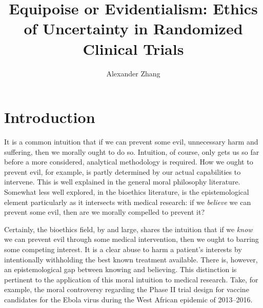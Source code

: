 \documentclass[letterpaper,notitlepage,12pt]{article}
\title{Equipoise or Evidentialism: Ethics of Uncertainty in Randomized Clinical
Trials}
\author{Alexander Zhang}
\date{}
\begin{document}
\maketitle

\section{Introduction}

It is a common intuition that if we can prevent some evil, unnecessary harm and
suffering, then we morally ought to do so.
Intuition, of course, only gets us so far before a more considered, analytical
methodology is required.
How we ought to prevent evil, for example, is partly determined by our actual
capabilities to intervene.
This is well explained in the general moral philosophy literature.
Somewhat less well explored, in the bioethics literature, is the epistemological
element particularly as it intersects with medical research: if we
\textit{believe} we can prevent some evil, then are we morally compelled to
prevent it?

Certainly, the bioethics field, by and large, shares the intuition that if we
\textit{know} we can prevent evil through some medical intervention, then we
ought to barring some competing interest.
It is a clear abuse to harm a patient's interests by intentionally withholding
the best known treatment available.
There is, however, an epistemological gap between knowing and believing.
This distinction is pertinent to the application of this moral intuition to
medical research.
Take, for example, the moral controversy regarding the Phase II trial design for
vaccine candidates for the Ebola virus during the West African epidemic of
2013--2016.
\end{document}
